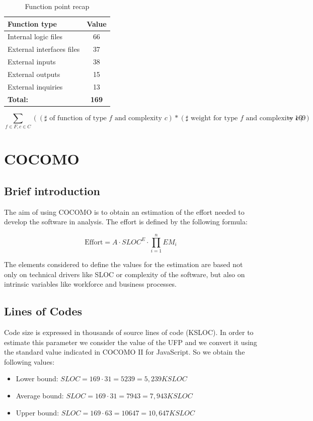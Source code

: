 \begin{table}[!h]
\centering
\caption{Function point recap}
\label{einq-recap}
\begin{tabularx}{\linewidth}{Xc}
\hline
\textbf{Function type}            & \textbf{Value}      \\ \hline
Internal logic files       & 66 \\
External interfaces files  & 37 \\
External inputs            & 38 \\
External outputs           & 15 \\
External inquiries         & 13 \\ \hline
\textbf{Total:}            & \textbf{169}
\end{tabularx}
\end{table}

\[ \sum_{f\in F, c\in C} ((\sharp \text{ of function of type } f \text{ and complexity }c)*(\sharp \text{ weight for type } f \text{ and complexity }c)) = 169 \]

\clearpage
\section{COCOMO}

\subsection{Brief introduction}
The aim of using COCOMO is to obtain an estimation of the effort needed to develop the software in analysis.
The effort is defined by the following formula:

\[ \text{Effort} = A \cdot SLOC^{E} \cdot\prod_{i=1}^nEM_{i} \]

The elements considered to define the values for the estimation are based not only on technical drivers like SLOC or complexity of the software, but also on intrinsic variables like workforce and business processes.

\subsection{Lines of Codes}
Code size is expressed in thousands of source lines of code (KSLOC).
In order to estimate this parameter we consider the value of the UFP and we convert it using the standard value indicated in COCOMO II for JavaScript.
So we obtain the following values:
\begin{itemize}
\item Lower bound: \( SLOC = 169 \cdot 31 = 5239 = 5,239 KSLOC \)
\item Average bound: \( SLOC = 169 \cdot 31 = 7943 = 7,943 KSLOC \)
\item Upper bound: \( SLOC = 169 \cdot 63 = 10647 = 10,647 KSLOC \)
\end{itemize}


